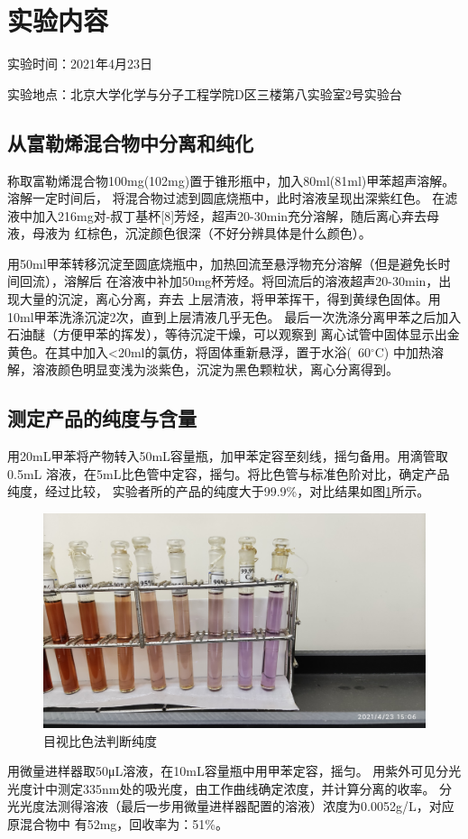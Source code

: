 \documentclass[a4paper,zihao=5,UTF8]{ctexart}
\newcommand{\mr}[1]{\mathrm{#1}}
\def\celsius{^{\circ}\mr{C}}
\begin{document}
    \section{实验内容}
    实验时间：2021年4月23日
    \par
    实验地点：北京大学化学与分子工程学院D区三楼第八实验室2号实验台
    \subsection{从富勒烯混合物中分离和纯化}
    称取富勒烯混合物100mg(102mg)置于锥形瓶中，加入80ml(81ml)甲苯超声溶解。溶解一定时间后，
    将混合物过滤到圆底烧瓶中，此时溶液呈现出深紫红色。
    在滤液中加入216mg对-叔丁基杯[8]芳烃，超声20-30min充分溶解，随后离心弃去母液，母液为
    红棕色，沉淀颜色很深（不好分辨具体是什么颜色）。
    \par 
    用50ml甲苯转移沉淀至圆底烧瓶中，加热回流至悬浮物充分溶解（但是避免长时间回流），溶解后
    在溶液中补加50mg杯芳烃。将回流后的溶液超声20-30min，出现大量的沉淀，离心分离，弃去
    上层清液，将甲苯挥干，得到黄绿色固体。用10ml甲苯洗涤沉淀2次，直到上层清液几乎无色。
    最后一次洗涤分离甲苯之后加入石油醚（方便甲苯的挥发），等待沉淀干燥，可以观察到
    离心试管中固体显示出金黄色。在其中加入<20ml的氯仿，将固体重新悬浮，置于水浴(~60$\celsius$)
    中加热溶解，溶液颜色明显变浅为淡紫色，沉淀为黑色颗粒状，离心分离得到。
    \subsection{测定产品的纯度与含量}
    用20mL甲苯将产物转入50mL容量瓶，加甲苯定容至刻线，摇匀备用。用滴管取0.5mL
    溶液，在5mL比色管中定容，摇匀。将比色管与标准色阶对比，确定产品纯度，经过比较，
    实验者所的产品的纯度大于99.9\%，对比结果如图\ref{compare}所示。
    \begin{figure}[htbp]
        \centering
        \includegraphics[scale=0.1]{compare.jpg}
        \caption{目视比色法判断纯度}
        \label{compare}
    \end{figure}
    用微量进样器取50μL溶液，在10mL容量瓶中用甲苯定容，摇匀。
    用紫外可见分光光度计中测定335nm处的吸光度，由工作曲线确定浓度，并计算分离的收率。
    分光光度法测得溶液（最后一步用微量进样器配置的溶液）浓度为0.0052g/L，对应原混合物中
    有52mg，回收率为：51\%。
\end{document}
